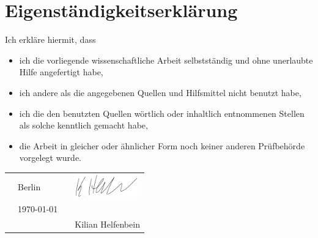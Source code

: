 
\section*{Eigenständigkeitserklärung}

\vspace{1cm}

Ich erkläre hiermit, dass

\begin{itemize}
	\item ich die vorliegende wissenschaftliche Arbeit selbstständig und ohne unerlaubte Hilfe angefertigt habe,
	\item ich andere als die angegebenen Quellen und Hilfsmittel nicht benutzt habe,
	\item ich die den benutzten Quellen wörtlich oder inhaltlich entnommenen Stellen als solche kenntlich gemacht habe, 
	\item die Arbeit in gleicher oder ähnlicher Form noch keiner anderen Prüfbehörde vorgelegt wurde.
\end{itemize}

\vspace{1cm}

\begin{tabular}{p{10mm}>{\centering\arraybackslash}p{50mm}p{10mm}>{\centering\arraybackslash}p{50mm}}
	&	{\large Berlin}	&	&	\includegraphics[height=1cm]{Bilder/my_signature}								\\
	&	{\large \today}	& 	&	\hrulefill 						\\
	&					&	&	{\small Kilian Helfenbein}	
\end{tabular}

\newpage